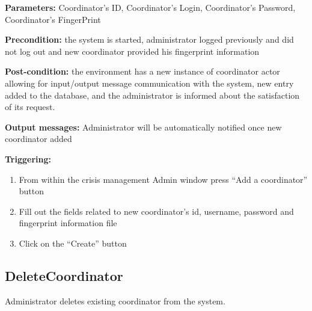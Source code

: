 \begin{description}

\item \textbf{Parameters:} Coordinator's ID, Coordinator's Login, Coordinator's
Password, Coordinator's FingerPrint
\item \textbf{Precondition:} the system is started, administrator logged
previously and did not log out and new coordinator provided his fingerprint
information
\item \textbf{Post-condition:} the environment has a new instance of coordinator
actor allowing for input/output message communication with the system, new entry
added to the database, and the administrator is informed about the satisfaction
of its request.
\item \textbf{Output messages:} Administrator will be automatically notified
once new coordinator added

\item \textbf{Triggering:}
\begin{enumerate}
\item From within the crisis management Admin window press ``Add a coordinator''
button
\item Fill out the fields related to new coordinator's id, username, password
and fingerprint information file
\item Click on the ``Create'' button
\end{enumerate}

\end{description}

\subsection{DeleteCoordinator}
\label{operation:deletecoordinator}

Administrator deletes existing coordinator from the system.

